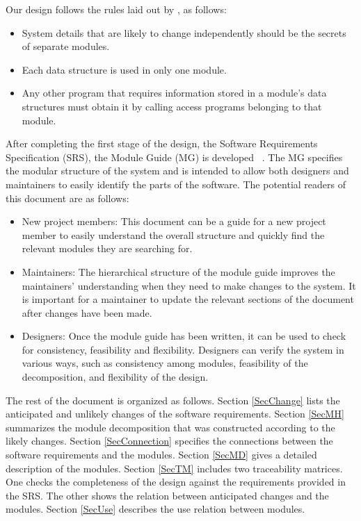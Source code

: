 \documentclass[12pt, titlepage]{article}
\begin{document}
Our design follows the rules laid out by \citet{ParnasEtAl1984}, as follows:
\begin{itemize}
    \item System details that are likely to change independently should be the secrets of separate modules.
    \item Each data structure is used in only one module.
    \item Any other program that requires information stored in a module's data
      structures must obtain it by calling access programs belonging to that module.
\end{itemize}

After completing the first stage of the design, the Software Requirements Specification (SRS), the Module Guide (MG) is developed ~\citep{ParnasEtAl1984}. The MG specifies the modular structure of the system and is intended to allow both designers and maintainers to easily identify the parts of the software. The potential readers of this document are as follows:

\begin{itemize}
    \item New project members: This document can be a guide for a new project member
      to easily understand the overall structure and quickly find the
      relevant modules they are searching for.
    \item Maintainers: The hierarchical structure of the module guide improves the
      maintainers' understanding when they need to make changes to the system. It is
      important for a maintainer to update the relevant sections of the document
      after changes have been made.
    \item Designers: Once the module guide has been written, it can be used to
      check for consistency, feasibility and flexibility. Designers can verify the
      system in various ways, such as consistency among modules, feasibility of the
      decomposition, and flexibility of the design.
\end{itemize}

The rest of the document is organized as follows. Section
\ref{SecChange} lists the anticipated and unlikely changes of the software
requirements. Section \ref{SecMH} summarizes the module decomposition that
was constructed according to the likely changes. Section \ref{SecConnection}
specifies the connections between the software requirements and the
modules. Section \ref{SecMD} gives a detailed description of the
modules. Section \ref{SecTM} includes two traceability matrices. One checks
the completeness of the design against the requirements provided in the SRS. The
other shows the relation between anticipated changes and the modules. Section
\ref{SecUse} describes the use relation between modules.
\end{document}
